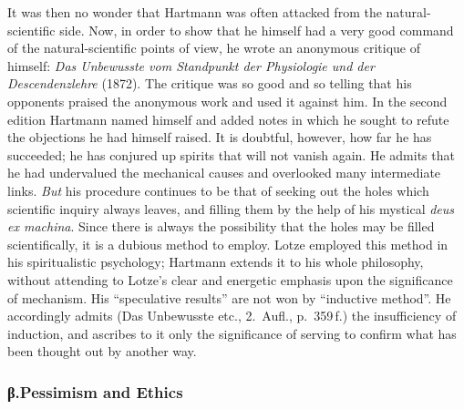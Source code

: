 \documentclass[12pt,a4paper]{book}
\newcommand{\opage}[1]{\marginnote{\footnotesize\textit{[#1]}}}
\begin{document}
It was then no wonder that Hartmann was often attacked from the natural-scientific
side. Now, in order to show that he himself had a very good command of the
natural-scientific points of view, he wrote an anonymous critique of himself:
\textit{Das Unbewusste vom Standpunkt der Physiologie und der Descendenzlehre}
(1872). The critique was so good and so telling that his opponents praised the
anonymous work and used it against him. In the second edition Hartmann named
himself and added notes in which he sought to refute the objections he had
himself raised. It is doubtful, however, how far he has succeeded; he has
conjured up spirits that will not vanish again. He admits that he had undervalued
the mechanical causes and overlooked many intermediate links. \emph{But} his procedure
continues to be that of seeking out the holes which scientific inquiry always
leaves, and filling them by the help of his mystical \textit{deus ex machina}.
Since there is always the possibility that the holes may be filled
\opage{540}scientifically, it is a dubious method to employ. Lotze employed this method in
his spiritualistic psychology; Hartmann extends it to his whole philosophy,
without attending to Lotze's clear and energetic emphasis upon the significance
of mechanism. His ``speculative results'' are not won by ``inductive method''. He
accordingly admits (Das Unbewusste etc., 2.~Aufl., p.~359\,f.) the insufficiency
of induction, and ascribes to it only the significance of serving to confirm what
has been thought out by another way.

\subsubsection*{β.\quad Pessimism and Ethics}
\end{document}
